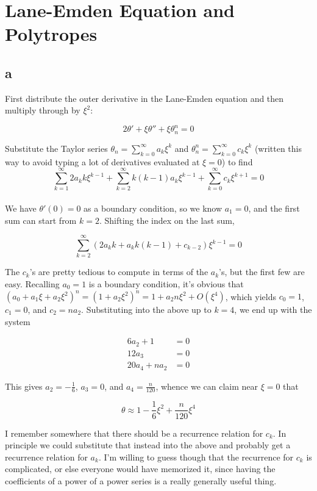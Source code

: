 \documentclass[12pt]{article}
\begin{document}
\section{Lane-Emden Equation and Polytropes}

\subsection*{a}

First distribute the outer derivative in the Lane-Emden equation and then multiply through by \(\xi^2\):

\[ 2\theta'+\xi\theta'' + \xi\theta_n^n = 0
\]

Substitute the Taylor series \( \theta_n= \sum\limits_{k=0}^\infty a_k \xi^k \) and \( \theta_n^n= \sum\limits_{k=0}^\infty c_k \xi^k \) (written this way to avoid typing a lot of derivatives evaluated at \(\xi=0\)) to find\\

\[\sum\limits_{k=1}^\infty 2a_k k \xi^{k-1}  + \sum\limits_{k=2}^\infty k(k-1)a_k \xi^{k-1} +  \sum\limits_{k=0}^\infty c_k \xi^{k+1} = 0
\]\\

We have \(\theta'(0) = 0\) as a boundary condition, so we know \(a_1 = 0\), and the first sum can start from \(k=2\). Shifting the index on the last sum,

\[ \sum\limits_{k=2}^\infty \left(2a_{k}k +a_k k(k-1) + c_{k-2}\right)\xi^{k-1} = 0
\]

The \(c_k\)'s are pretty tedious to compute in terms of the \(a_k\)'s, but the first few are easy. Recalling \(a_0 = 1\) is a boundary condition, it's obvious that \(  \left(a_0+a_1\xi+ a_2\xi^2\right)^n = \left( 1+a_2\xi^2 \right)^n = 1 + a_2 n \xi^2 + O(\xi^4)\), which yields \(c_0 = 1\), \(c_1 = 0\), and \(c_2 = na_2\). Substituting into the above up to \(k=4\), we end up with the system

\begin{align*}
6a_2 + 1 &= 0\\
12a_3 &= 0\\
20a_4 + na_2 &= 0
\end{align*}

This gives \(a_2 = -\frac{1}{6}\), \(a_3 = 0\), and \(a_4 = \frac{n}{120}\), whence we can claim near \(\xi=0\) that

\[ \theta \approx 1 - \frac{1}{6}\xi^2 + \frac{n}{120}\xi^4
\]

I remember somewhere that there should be a recurrence relation for \(c_k\). In principle we could substitute that instead into the above and probably get a recurrence relation for \(a_k\). I'm willing to guess though that the recurrence for \(c_k\) is complicated, or else everyone would have memorized it, since having the coefficients of a power of a power series is a really generally useful thing.
\end{document}
